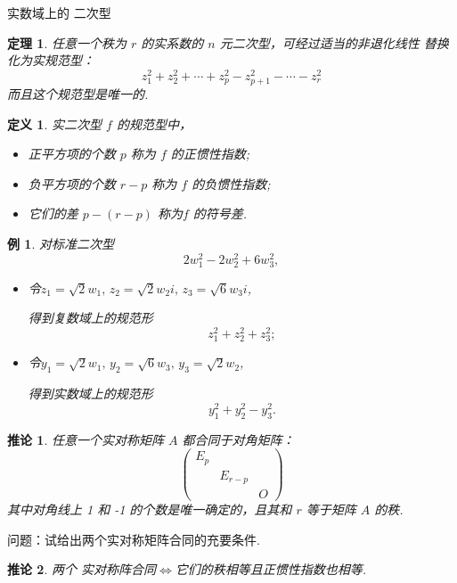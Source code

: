 \documentclass[13pt]{beamer}
\newtheorem{thm}{定理}
\newtheorem{exa}{例}
\newtheorem*{defi}{定义}
\newtheorem*{coro}{推论}
\begin{document}
\begin{frame}{ 实数域上的 二次型}
\begin{thm}
任意一个秩为 $r$ 的实系数的 $n$ 元二次型，可经过适当的非退化线性
替换化为实规范型：
\[
z_{1}^{2}+z_{2}^{2}+\cdots+z_{p}^{2}-z_{p+1}^{2}-\cdots-z_{r}^{2}
\]
而且这个规范型是唯一的.
\end{thm}
\begin{defi}
	实二次型 $f$ 的规范型中，
	\begin{itemize}
		\item 正平方项的个数 $p$ 称为 $f$ 的\alert{正惯性指数};
		\item 负平方项的个数 $r-p$ 称为 $f$ 的\alert{负惯性指数};
		\item 它们的差 $p-(r-p)$ 称为$f$ 的\alert{符号差}.
	\end{itemize}
\end{defi}
\end{frame}


\begin{frame}
\begin{exa}
对标准二次型
\[
2 w_{1}^{2}-2 w_{2}^{2}+6 w_{3}^{2}, 
\]
\begin{itemize}
\item 令$z_1=\sqrt{2}w_1, \, z_2=\sqrt{2}w_2 i, \,  z_3=\sqrt{6}w_3 i$,

得到复数域上的规范形 $$z_1^2+z_2^2+z_3^2;$$

\item 令$y_1=\sqrt{2}w_1, \,  y_2=\sqrt{6}w_3, \,   y_3=\sqrt{2}w_2$,

得到实数域上的规范形 $$y_1^2+y_2^2-y_3^2.$$
\end{itemize}



\end{exa}

\end{frame}
\begin{frame}
\begin{coro}
任意一个实对称矩阵 $A$ 都合同于对角矩阵：
\[
\left(\begin{array}{ccc}
E_p & & \\
& E_{r-p} & \\
& & O
\end{array}\right)
\]
其中对角线上 1 和 -1 的个数是唯一确定的，且其和 $r$ 等于矩阵 $A$ 的秩. 
\end{coro}

问题：试给出两个实对称矩阵合同的充要条件. 
\pause
\begin{coro}
两个
实对称阵合同$\Leftrightarrow$它们的秩相等且正惯性指数也相等.
\end{coro}
\end{frame}
\end{document}
